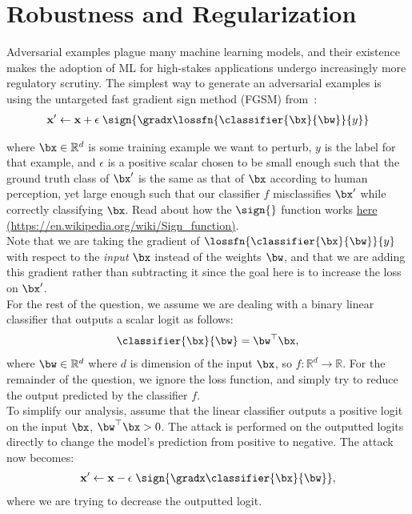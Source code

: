 \section{Robustness and Regularization}
Adversarial examples plague many machine learning models, and their existence makes the adoption of ML for high-stakes applications undergo increasingly more regulatory scrutiny. The simplest way to generate an adversarial examples is using the untargeted fast gradient sign method (FGSM) from~\cite{goodfellow2014explaining}:
\begin{align*}
    \mathbf{x}' \leftarrow \mathbf{x} + \epsilon \; \sign{\gradx \lossfn{\classifier{\bx}{\bw}}{y}} 
\end{align*}

\noindent where $\bx \in \mathbb{R}^d$ is some training example we want to perturb, $y$ is the label for that example, and $\epsilon$ is a positive scalar chosen to be small enough such that the ground truth class of $\bx'$ is the same as that of $\bx$ according to human perception, yet large enough such that our classifier $f$ misclassifies $\bx'$ while correctly classifying $\bx$. Read about how the $\sign{}$ function works \href{https://en.wikipedia.org/wiki/Sign_function}{here (\url{https://en.wikipedia.org/wiki/Sign_function})}.\\

\noindent Note that we are taking the gradient of $\lossfn{\classifier{\bx}{\bw}}{y}$ with respect to the \textit{input} $\bx$ instead of the weights $\bw$, and that we are adding this gradient rather than subtracting it since the goal here is to increase the loss on $\bx'$. \\

\noindent For the rest of the question, we assume we are dealing with a binary linear classifier that outputs a scalar logit as follows:
\begin{align*}
    \classifier{\bx}{\bw} = \bw^{\top}\bx,
\end{align*}
\noindent where $\bw \in \mathbb{R}^{d}$ where $d$ is dimension of the input $\bx$, so $f: \mathbb{R}^d \rightarrow \mathbb{R}$. For the remainder of the question, we ignore the loss function, and simply try to reduce the output predicted by the classifier $f$. \\

\noindent To simplify our analysis, assume that the linear classifier outputs a positive logit on the input $\bx$, $\bw^{\top}\bx > 0$. The attack is performed on the outputted logits directly to change the model's prediction from positive to negative. The attack now becomes:
\begin{align*}
    \mathbf{x}' \leftarrow \mathbf{x} - \epsilon \; \sign{\gradx \classifier{\bx}{\bw}},
\end{align*}
\noindent where we are trying to decrease the outputted logit.

